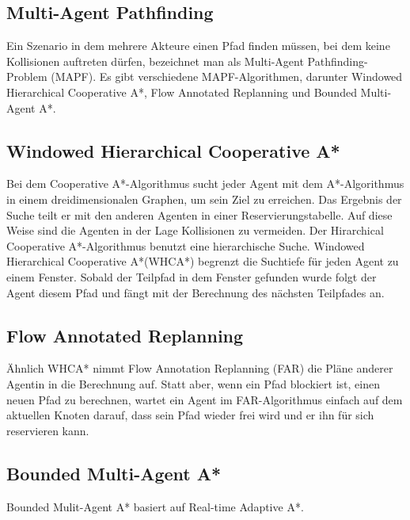 \subsection{Multi-Agent Pathfinding}%

Ein Szenario in dem mehrere Akteure einen Pfad finden müssen, bei dem keine Kollisionen auftreten dürfen, bezeichnet man als Multi-Agent Pathfinding-Problem (MAPF). Es gibt verschiedene MAPF-Algorithmen, darunter Windowed Hierarchical Cooperative A*, Flow Annotated Replanning und Bounded Multi-Agent A*.

\subsection{Windowed Hierarchical Cooperative A*}
Bei dem Cooperative A*-Algorithmus sucht jeder Agent mit dem A*-Algorithmus in einem dreidimensionalen Graphen, um sein Ziel zu erreichen. Das Ergebnis der Suche teilt er mit den anderen Agenten in einer Reservierungstabelle. Auf diese Weise sind die Agenten in der Lage Kollisionen zu vermeiden. Der Hirarchical Cooperative A*-Algorithmus benutzt eine hierarchische Suche. Windowed Hierarchical Cooperative A*(WHCA*) begrenzt die Suchtiefe für jeden Agent zu einem Fenster. Sobald der Teilpfad in dem Fenster gefunden wurde folgt der Agent diesem Pfad und fängt mit der Berechnung des nächsten Teilpfades an. 
\subsection{Flow Annotated Replanning}
Ähnlich WHCA* nimmt Flow Annotation Replanning (FAR) die Pläne anderer Agentin in die Berechnung auf. Statt aber, wenn ein Pfad blockiert ist, einen neuen Pfad zu berechnen, wartet ein Agent im FAR-Algorithmus einfach auf dem aktuellen Knoten darauf, dass sein Pfad wieder frei wird und er ihn für sich reservieren kann. 

\subsection{Bounded Multi-Agent A*}
Bounded Mulit-Agent A* basiert auf Real-time Adaptive A*.
\cite{Sigurdson.2019}